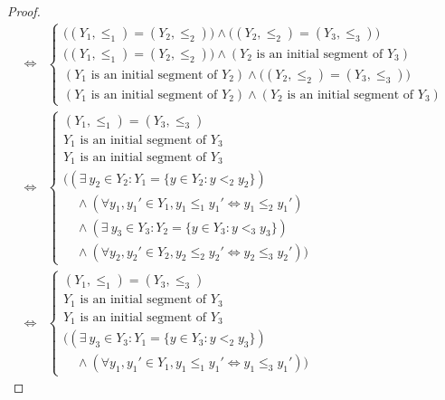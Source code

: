 \begin{proof}
\begin{align*}
        \iff & \begin{cases}
                   \big((Y_1, \leq_1) = (Y_2, \leq_2)\big) \land \big((Y_2, \leq_2) = (Y_3, \leq_3)\big)     \\
                   \big((Y_1, \leq_1) = (Y_2, \leq_2)\big) \land (Y_2 \text{ is an initial segment of } Y_3) \\
                   (Y_1 \text{ is an initial segment of } Y_2) \land \big((Y_2, \leq_2) = (Y_3, \leq_3)\big) \\
                   (Y_1 \text{ is an initial segment of } Y_2) \land (Y_2 \text{ is an initial segment of } Y_3)
               \end{cases}                                                                      \\
        \iff & \begin{cases}
                   (Y_1, \leq_1) = (Y_3, \leq_3)                                                 \\
                   Y_1 \text{ is an initial segment of } Y_3                                     \\
                   Y_1 \text{ is an initial segment of } Y_3                                     \\
                   \big((\exists\ y_2 \in Y_2 : Y_1 = \{y \in Y_2 : y <_2 y_2\})                 \\
                   \quad \land (\forall y_1, y_1' \in Y_1, y_1 \leq_1 y_1' \iff y_1 \leq_2 y_1') \\
                   \quad \land (\exists\ y_3 \in Y_3 : Y_2 = \{y \in Y_3 : y <_3 y_3\})          \\
                   \quad \land (\forall y_2, y_2' \in Y_2, y_2 \leq_2 y_2' \iff y_2 \leq_3 y_2')\big)
               \end{cases}                                                                                 \\
        \iff & \begin{cases}
                   (Y_1, \leq_1) = (Y_3, \leq_3)                                 \\
                   Y_1 \text{ is an initial segment of } Y_3                     \\
                   Y_1 \text{ is an initial segment of } Y_3                     \\
                   \big((\exists\ y_3 \in Y_3 : Y_1 = \{y \in Y_3 : y <_2 y_3\}) \\
                   \quad \land (\forall y_1, y_1' \in Y_1, y_1 \leq_1 y_1' \iff y_1 \leq_3 y_1')\big)

\end{cases}
\end{align*}
\end{proof}
